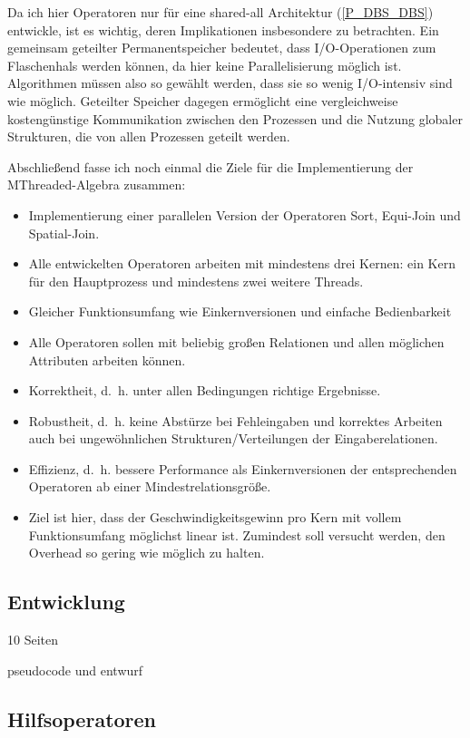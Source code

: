 \documentclass[a4paper,12pt,twoside]{article}
\begin{document}
Da ich hier Operatoren nur für eine shared-all Architektur (\autoref{P_DBS_DBS}) entwickle, ist es wichtig, deren Implikationen insbesondere zu betrachten. Ein gemeinsam geteilter Permanentspeicher bedeutet, dass I/O-Operationen zum Flaschenhals werden können, da hier keine Parallelisierung möglich ist. Algorithmen müssen also so gewählt werden, dass sie so wenig I/O-intensiv sind wie möglich. Geteilter Speicher dagegen ermöglicht eine vergleichweise kostengünstige Kommunikation zwischen den Prozessen und die Nutzung globaler Strukturen, die von allen Prozessen geteilt werden.

Abschließend fasse ich noch einmal die Ziele für die Implementierung der MThreaded-Algebra zusammen:

\begin{itemize}
	\item Implementierung einer parallelen Version der Operatoren Sort, Equi-Join und Spatial-Join.
	\item Alle entwickelten Operatoren arbeiten mit mindestens drei Kernen: ein Kern für den Hauptprozess und mindestens zwei weitere Threads.
	\item Gleicher Funktionsumfang wie Einkernversionen und einfache Bedienbarkeit
	\item Alle Operatoren sollen mit beliebig großen Relationen und allen möglichen Attributen arbeiten können.  
	\item Korrektheit, d.~h. unter allen Bedingungen richtige Ergebnisse.
	\item Robustheit, d.~h. keine Abstürze bei Fehleingaben und korrektes Arbeiten auch bei ungewöhnlichen Strukturen/Verteilungen der Eingaberelationen.
	\item Effizienz, d.~h. bessere Performance als Einkernversionen der entsprechenden Operatoren ab einer Mindestrelationsgröße.
	\item Ziel ist hier, dass der Geschwindigkeitsgewinn pro Kern mit vollem Funktionsumfang möglichst linear ist. Zumindest soll versucht werden, den Overhead so gering wie möglich zu halten.
\end{itemize}

\subsection{Entwicklung} 10 Seiten
\label{Entwicklung} 

pseudocode und entwurf



\subsection{Hilfsoperatoren}
\end{document}

